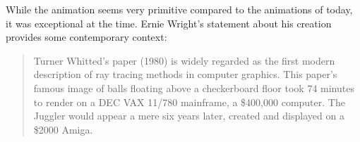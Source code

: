 \documentclass[
  twoside,
  11pt, a4paper,
  footinclude=true,
  headinclude=true,
  cleardoublepage=empty
]{scrreprt}
\begin{document}
\begin{figure}[H]
    \centering
    \hfill
\end{figure}
While the animation seems very primitive compared to the animations of today, it was exceptional at
the time. Ernie Wright's statement about his creation provides some contemporary context:

\blockquote[\cite{site:juggler}]{Turner Whitted's paper (1980) is widely regarded as the first modern
    description of ray tracing methods in computer graphics. This paper's famous image of balls floating
    above a checkerboard floor took 74 minutes to render on a DEC VAX 11/780 mainframe, a \$400,000
computer. The Juggler would appear a mere six years later, created and displayed on a \$2000 Amiga.}
\end{document}
